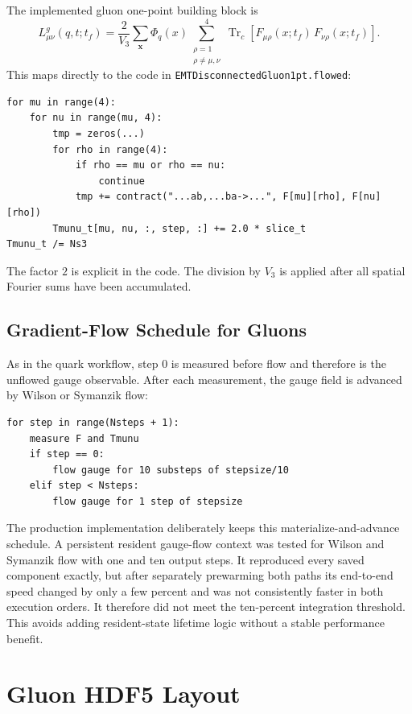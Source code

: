 \documentclass[11pt,a4paper]{article}
\newcommand{\code}[1]{\texttt{\begingroup\def\_{\textunderscore\allowbreak}#1\endgroup}}
\newcommand{\Trc}{\operatorname{Tr}_{c}}
\newcommand{\Vthree}{V_3}
\newcommand{\Tf}{t_f}
\begin{document}
The implemented gluon one-point building block is
\begin{equation}
  L^g_{\mu\nu}(q,t;\Tf)
  =
  \frac{2}{\Vthree}
  \sum_{\mathbf{x}}\Phi_q(x)
  \sum_{\substack{\rho=1\\ \rho\ne\mu,\nu}}^{4}
  \Trc\!\left[
    F_{\mu\rho}(x;\Tf)\,
    F_{\nu\rho}(x;\Tf)
  \right].
  \label{eq:gluon_loop}
\end{equation}
This maps directly to the code in \code{EMTDisconnectedGluon1pt.flowed\_1pt}:
\begin{verbatim}
for mu in range(4):
    for nu in range(mu, 4):
        tmp = zeros(...)
        for rho in range(4):
            if rho == mu or rho == nu:
                continue
            tmp += contract("...ab,...ba->...", F[mu][rho], F[nu][rho])
        Tmunu_t[mu, nu, :, step, :] += 2.0 * slice_t
Tmunu_t /= Ns3
\end{verbatim}
The factor \(2\) is explicit in the code.  The division by \(\Vthree\) is
applied after all spatial Fourier sums have been accumulated.

\subsection{Gradient-Flow Schedule for Gluons}

As in the quark workflow, step \(0\) is measured before flow and therefore is
the unflowed gauge observable.  After each measurement, the gauge field is
advanced by Wilson or Symanzik flow:
\begin{verbatim}
for step in range(Nsteps + 1):
    measure F and Tmunu
    if step == 0:
        flow gauge for 10 substeps of stepsize/10
    elif step < Nsteps:
        flow gauge for 1 step of stepsize
\end{verbatim}

The production implementation deliberately keeps this materialize-and-advance
schedule.  A persistent resident gauge-flow context was tested for Wilson and
Symanzik flow with one and ten output steps.  It reproduced every saved
component exactly, but after separately prewarming both paths its end-to-end
speed changed by only a few percent and was not consistently faster in both
execution orders.  It therefore did not meet the ten-percent integration
threshold.  This avoids adding resident-state lifetime logic without a stable
performance benefit.

\section{Gluon HDF5 Layout}
\end{document}
